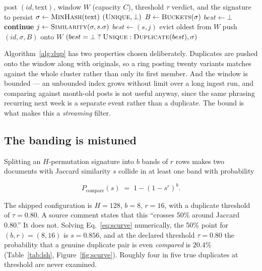 \documentclass[11pt]{article}
\begin{document}
\begin{algorithm}[t]
\caption{Streaming near-duplicate check against a bounded window}
\label{alg:dup}
\begin{algorithmic}[1]
\Require post $(id, \text{text})$, window $W$ (capacity $C$), threshold $\tau$
\Ensure verdict, and the signature to persist
\State $\sigma \gets \textsc{MinHash}(\text{text})$
\If{$\sigma = \bot$} 
  \State \Return $(\textsc{Unique}, \bot)$ 
\EndIf
\State $B \gets \textsc{Buckets}(\sigma)$ 
\State $best \gets \bot$
   \textbf{continue} 
  \EndIf
  \State $j \gets \textsc{Similarity}(\sigma, s.\sigma)$ 
    \State $best \gets (s, j)$
  \EndIf
\EndFor
{} \State evict oldest from $W$ \EndIf
\State push $(id, \sigma, B)$ onto $W$ 
\State \Return $(best = \bot \;?\; \textsc{Unique} : \textsc{Duplicate}(best), \sigma)$
\end{algorithmic}
\end{algorithm}

Algorithm~\ref{alg:dup} has two properties chosen deliberately. Duplicates are
pushed onto the window along with originals, so a ring posting twenty variants
matches against the whole cluster rather than only its first member. And the
window is bounded --- an unbounded index grows without limit over a long ingest
run, and comparing against month-old posts is not useful anyway, since the same
phrasing recurring next week is a separate event rather than a duplicate. The
bound is what makes this a \emph{streaming} filter.

\subsection{The banding is mistuned}

Splitting an $H$-permutation signature into $b$ bands of $r$ rows makes two
documents with Jaccard similarity $s$ collide in at least one band with
probability

\begin{equation}
P_{\text{compare}}(s) \;=\; 1 - (1 - s^{r})^{b}.
\label{eq:scurve}
\end{equation}

The shipped configuration is $H = 128$, $b = 8$, $r = 16$, with a duplicate
threshold of $\tau = 0.80$. A source comment states that this ``crosses 50\%
around Jaccard 0.80.'' It does not. Solving Eq.~\ref{eq:scurve} numerically,
the 50\% point for $(b,r) = (8,16)$ is $s = 0.856$, and at the declared
threshold $\tau = 0.80$ the probability that a genuine duplicate pair is even
\emph{compared} is $20.4\%$ (Table~\ref{tab:lsh}, Figure~\ref{fig:scurve}).
Roughly four in five true duplicates at threshold are never examined.
\end{document}
